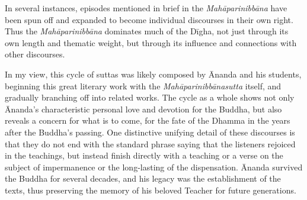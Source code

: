 \documentclass[12pt,openany]{book}%
\begin{document}
In several instances, episodes mentioned in brief in the \textit{\textsanskrit{Mahāparinibbāna}} have been spun off and expanded to become individual discourses in their own right. Thus the \textit{\textsanskrit{Mahāparinibbāna}} dominates much of the \textsanskrit{Dīgha}, not just through its own length and thematic weight, but through its influence and connections with other discourses.

In my view, this cycle of suttas was likely composed by Ānanda and his students, beginning this great literary work with the \textit{\textsanskrit{Mahāparinibbānasutta}} itself, and gradually branching off into related works. The cycle as a whole shows not only Ānanda’s characteristic personal love and devotion for the Buddha, but also reveals a concern for what is to come, for the fate of the Dhamma in the years after the Buddha’s passing. One distinctive unifying detail of these discourses is that they do not end with the standard phrase saying that the listeners rejoiced in the teachings, but instead finish directly with a teaching or a verse on the subject of impermanence or the long-lasting of the dispensation. Ānanda survived the Buddha for several decades, and his legacy was the establishment of the texts, thus preserving the memory of his beloved Teacher for future generations.
\end{document}
